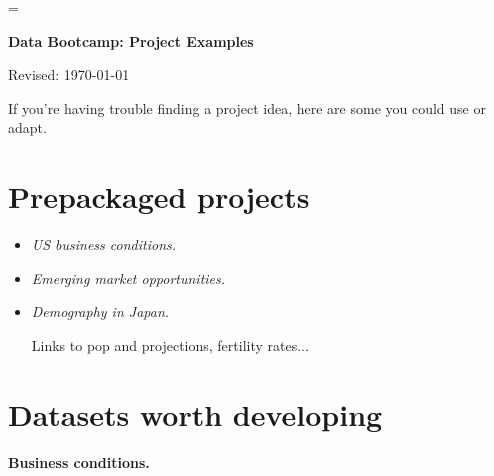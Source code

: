 \documentclass[11pt]{article}
\begin{document}
\parskip=\bigskipamount
\parindent=0.0in
\thispagestyle{empty}


\bigskip\bigskip
\centerline{\Large \bf Data Bootcamp:  Project Examples}
\centerline{Revised: \today}

\medskip
If you're having trouble finding a project idea, here are some you could use or adapt.  

\section*{Prepackaged projects}

\begin{itemize} 
\item {\it US business conditions.\/}


\item {\it Emerging market opportunities.\/} 


\item {\it Demography in Japan.\/}

Links to pop and projections, fertility rates... 

\end{itemize} 


\section*{Datasets worth developing}



{\bf Business conditions.\/}



\end{document}
